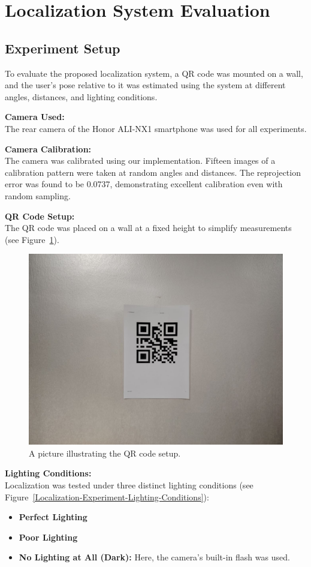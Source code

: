 \section{Localization System Evaluation}

\subsection{Experiment Setup}

To evaluate the proposed localization system, a QR code was mounted on a wall, and the user's pose relative to it was estimated using the system at different angles, distances, and lighting conditions.

\textbf{Camera Used:}\\
The rear camera of the Honor ALI-NX1 smartphone was used for all experiments.

\textbf{Camera Calibration:}\\
The camera was calibrated using our implementation. Fifteen images of a calibration pattern were taken at random angles and distances. The reprojection error was found to be 0.0737, demonstrating excellent calibration even with random sampling.

\textbf{QR Code Setup:}\\
The QR code was placed on a wall at a fixed height to simplify measurements (see Figure~\ref{Localization-Experiment-QR-Setup}).

\begin{figure}[h!]
	\centering
	\includegraphics[width=0.7\linewidth]{assets/ch4/QR on a wall.jpg}
	\caption{A picture illustrating the QR code setup.}
	\label{Localization-Experiment-QR-Setup}
\end{figure}

\textbf{Lighting Conditions:}\\
Localization was tested under three distinct lighting conditions (see Figure~\ref{Localization-Experiment-Lighting-Conditions}):
\begin{itemize}
	\item \textbf{Perfect Lighting}
	\item \textbf{Poor Lighting}
	\item \textbf{No Lighting at All (Dark):} Here, the camera's built-in flash was used.
\end{itemize}

